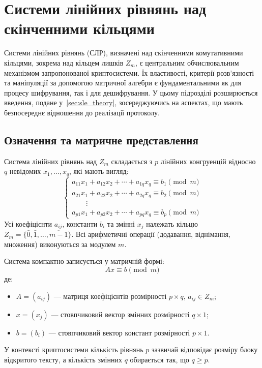 \section{Системи лінійних рівнянь над скінченними кільцями}
\label{sec:sle_over_rings}
Системи лінійних рівнянь (СЛР), визначені над скінченними комутативними кільцями, зокрема над кільцем лишків $Z_m$, є центральним обчислювальним механізмом запропонованої криптосистеми.
Їх властивості, критерії розв'язності та маніпуляції за допомогою матричної алгебри є фундаментальними як для процесу шифрування, так і для дешифрування.
У цьому підрозділі розширюється введення, подане у~\ref{sec:sle_theory}, зосереджуючись на аспектах, що мають безпосереднє відношення до реалізації протоколу.

\subsection{Означення та матричне представлення}
\label{subsec:sle_definition_rings}
Система лінійних рівнянь над $Z_m$ складається з $p$ лінійних конгруенцій відносно $q$ невідомих $x_1, \ldots, x_q$, які мають вигляд:
\[
    \begin{cases}
        a_{11}x_1 + a_{12}x_2 + \cdots + a_{1q}x_q \equiv b_1 \pmod{m} \\
        a_{21}x_1 + a_{22}x_2 + \cdots + a_{2q}x_q \equiv b_2 \pmod{m} \\
        \qquad \vdots \\
        a_{p1}x_1 + a_{p2}x_2 + \cdots + a_{pq}x_q \equiv b_p \pmod{m}
    \end{cases}
\]
Усі коефіцієнти $a_{ij}$, константи $b_i$ та змінні $x_j$ належать кільцю $Z_m = \{\bar{0}, \bar{1}, \ldots, \overline{m-1}\}$.
Всі арифметичні операції (додавання, віднімання, множення) виконуються за модулем $m$.

Система компактно записується у матричній формі:
\[
    Ax \equiv b \pmod{m}
\]
де:
\begin{itemize}
    \item $A = (a_{ij})$ — матриця коефіцієнтів розмірності $p \times q$, $a_{ij} \in Z_m$;
    \item $x = (x_j)$ — стовпчиковий вектор змінних розмірності $q \times 1$;
    \item $b = (b_i)$ — стовпчиковий вектор констант розмірності $p \times 1$.
\end{itemize}
У контексті криптосистеми кількість рівнянь $p$ зазвичай відповідає розміру блоку відкритого тексту, а кількість змінних $q$ обирається так, що $q \geq p$.

